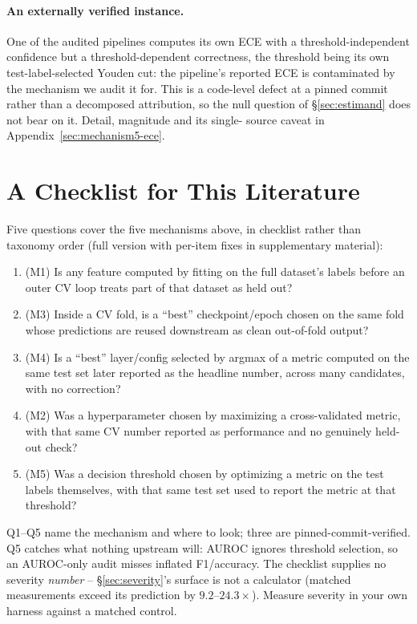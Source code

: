 \documentclass{article}
\begin{document}
\paragraph{An externally verified instance.} One of the audited pipelines
computes its own ECE with a threshold-independent confidence but a
threshold-dependent correctness, the threshold being its own
test-label-selected Youden cut: the pipeline's reported ECE is contaminated
by the mechanism we audit it for. This is a code-level defect at a pinned
commit rather than a decomposed attribution, so the null question of
\S\ref{sec:estimand} does not bear on it. Detail, magnitude and its single-
source caveat in Appendix~\ref{sec:mechanism5-ece}.

\section{A Checklist for This Literature}
\label{sec:checklist}

Five questions cover the five mechanisms above, in checklist rather than
taxonomy order (full version with per-item fixes in supplementary material):

\begin{enumerate}
\itemsep0pt
\item (M1) Is any feature computed by fitting on the full dataset's labels
   before an outer CV loop treats part of that dataset as held out?
\item (M3) Inside a CV fold, is a ``best'' checkpoint/epoch chosen on the same
   fold whose predictions are reused downstream as clean out-of-fold output?
\item (M4) Is a ``best'' layer/config selected by argmax of a metric computed
   on the same test set later reported as the headline number, across many
   candidates, with no correction?
\item (M2) Was a hyperparameter chosen by maximizing a cross-validated metric,
   with that same CV number reported as performance and no genuinely held-out
   check?
\item (M5) Was a decision threshold chosen by optimizing a metric on the test
   labels themselves, with that same test set used to report the metric at
   that threshold?
\end{enumerate}

Q1--Q5 name the mechanism and where to look; three are pinned-commit-verified.
Q5 catches what nothing upstream will: AUROC ignores threshold selection, so an
AUROC-only audit misses inflated F1/accuracy. The checklist supplies no
severity \emph{number} -- \S\ref{sec:severity}'s surface is not a calculator
(matched measurements exceed its prediction by $9.2$--$24.3\times$). Measure
severity in your own harness against a matched control.
\end{document}
